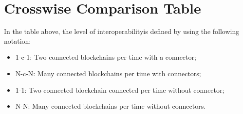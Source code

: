 \section{Crosswise Comparison Table}
 

\noindent In the table above, the level of interoperability\footnotemark[1] is defined by using the following notation:
\begin{itemize}
    \item 1-c-1: Two connected blockchains per time with a connector;
    \item N-c-N: Many connected blockchains per time with connectors;
    \item 1-1: Two connected blockchain connected per time without connector;
    \item N-N: Many connected blockchains per time without connectors.
\end{itemize}







